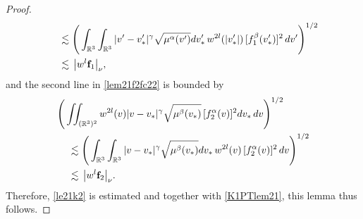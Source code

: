 \documentclass[reqno]{amsart}
\numberwithin{equation}{section}
\numberwithin{equation}{section}
\begin{document}
\begin{proof}
\begin{equation*}
\begin{aligned}
		&\hspace{0.4cm}\lesssim \Bigg(\int_{\mathbb{R}^3}\int_{\mathbb{R}^3}|v'-v_*'|^{\gamma}\sqrt{\mu^{\alpha}(v')} dv_*' \, w^{2l}(|v_*'|) \, [f^\beta_1(v_*')]^2\,dv' \Bigg)^{1/2}\\
		&\hspace{0.4cm}\lesssim \, \big|w^{l}\mathbf{f}_1\big|_{\nu},
	\end{aligned}
	\end{equation*}
	and the second line in \eqref{lem21f2fc22} is bounded by
	\begin{align*}
		&\Bigg(\iint_{(\mathbb{R}^3)^2 }w^{2l}(v)|v-v_*|^{\gamma} \sqrt{\mu^{\beta}(v_*)}\, [f^\alpha_2(v)]^2dv_*\,dv \Bigg)^{1/2} \\
		&\hspace{0.4cm}\lesssim \Bigg( \int_{\mathbb{R}^3}\int_{\mathbb{R}^3}|v-v_*|^{\gamma}\sqrt{\mu^{\beta}(v_*)}dv_* \,w^{2l}(v) \, [f^\alpha_2(v)]^2\,dv\Bigg)^{1/2}\\
		&\hspace{0.4cm}\lesssim \, \big|w^{l}\mathbf{f}_2\big|_{\nu}.
	\end{align*}
	Therefore, \eqref{le21k2} is estimated and together with \eqref{K1PTlem21}, this lemma thus follows.
	\end{proof}
	
	
	
\end{document}

